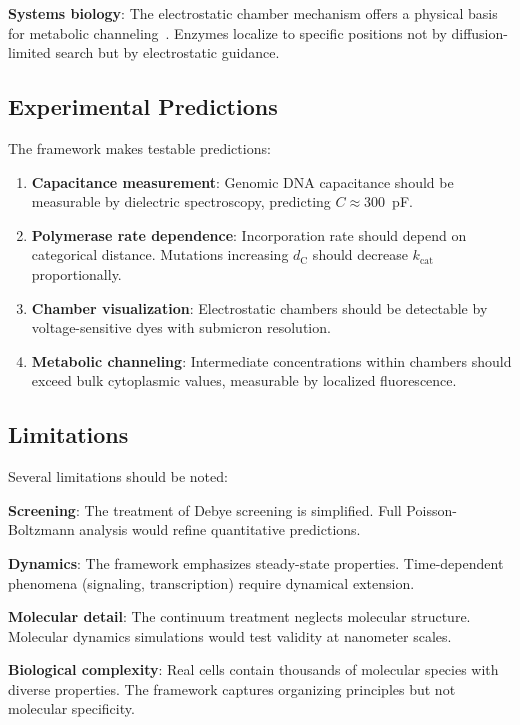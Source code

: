 \documentclass[twocolumn,aps,prb,superscriptaddress,longbibliography,floatfix]{revtex4-2}
\theoremstyle{remark}
\newcommand{\dC}{d_\text{C}}
\begin{document}
\textbf{Systems biology}: The electrostatic chamber mechanism offers a
physical basis for metabolic channeling~\cite{Srere1987}. Enzymes
localize to specific positions not by diffusion-limited search but by
electrostatic guidance.

\subsection{Experimental Predictions}

The framework makes testable predictions:

\begin{enumerate}
    \item \textbf{Capacitance measurement}: Genomic DNA capacitance
    should be measurable by dielectric spectroscopy, predicting
    $C \approx 300$~pF.

    \item \textbf{Polymerase rate dependence}: Incorporation rate should
    depend on categorical distance. Mutations increasing $\dC$ should
    decrease $k_\text{cat}$ proportionally.

    \item \textbf{Chamber visualization}: Electrostatic chambers should
    be detectable by voltage-sensitive dyes with submicron resolution.

    \item \textbf{Metabolic channeling}: Intermediate concentrations
    within chambers should exceed bulk cytoplasmic values, measurable by
    localized fluorescence.
\end{enumerate}

\subsection{Limitations}

Several limitations should be noted:

\textbf{Screening}: The treatment of Debye screening is simplified.
Full Poisson-Boltzmann analysis would refine quantitative predictions.

\textbf{Dynamics}: The framework emphasizes steady-state properties.
Time-dependent phenomena (signaling, transcription) require dynamical
extension.

\textbf{Molecular detail}: The continuum treatment neglects molecular
structure. Molecular dynamics simulations would test validity at
nanometer scales.

\textbf{Biological complexity}: Real cells contain thousands of
molecular species with diverse properties. The framework captures
organizing principles but not molecular specificity.
\end{document}
